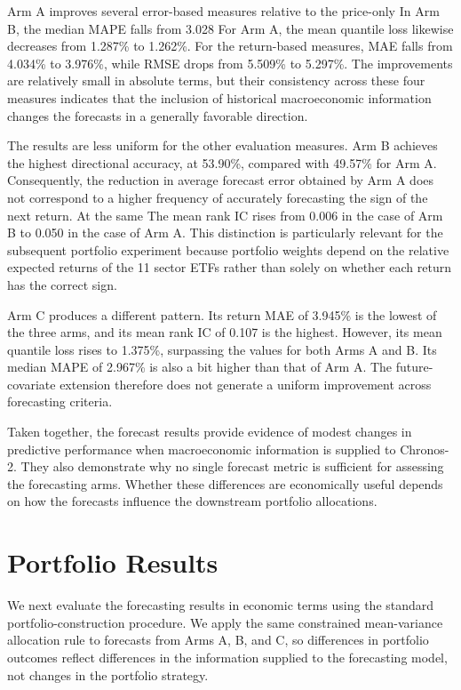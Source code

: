 \documentclass[12pt,a4paper,twoside,openany]{book}
\begin{document}
Arm A improves several error-based measures relative to the price-only
In Arm B, the median MAPE falls from 3.028%
For Arm A, the mean quantile loss likewise decreases from 1.287\% to
1.262\%. For the return-based measures, MAE falls from 4.034\% to
3.976\%, while RMSE drops from 5.509\% to 5.297\%. The
improvements are relatively small in absolute terms, but their
consistency across these four measures indicates that the inclusion
of historical macroeconomic information changes the forecasts in a
generally favorable direction.

The results are less uniform for the other evaluation measures. Arm B
achieves the highest directional accuracy, at 53.90\%, compared with
49.57\% for Arm A. Consequently, the reduction in average forecast
error obtained by Arm A does not correspond to a higher frequency of
accurately forecasting the sign of the next return. At the same
The mean rank IC rises from 0.006 in the case of Arm B to 0.050 in the case of
Arm A. This distinction is particularly relevant for the subsequent
portfolio experiment because portfolio weights depend on the relative
expected returns of the 11 sector ETFs rather than solely on whether
each return has the correct sign.

Arm C produces a different pattern. Its return MAE of 3.945\% is the
lowest of the three arms, and its mean rank IC of 0.107 is the
highest. However, its mean quantile loss rises to 1.375\%, surpassing
the values for both Arms A and B. Its median MAPE of 2.967\% is also
a bit higher than that of Arm A. The future-covariate extension
therefore does not generate a uniform improvement across forecasting
criteria.

Taken together, the forecast results provide evidence of modest
changes in predictive performance when macroeconomic information is
supplied to Chronos-2. They also demonstrate why no single forecast
metric is sufficient for assessing the forecasting arms. Whether
these differences are economically useful depends on how the forecasts
influence the downstream portfolio allocations.



\section{Portfolio Results}
\label{portfolio-results}

We next evaluate the forecasting results in economic terms using the standard portfolio-construction procedure. We apply the same constrained mean-variance allocation rule to forecasts from Arms A, B, and C, so differences in portfolio outcomes reflect differences in the information supplied to the forecasting model, not changes in the portfolio strategy.
\end{document}
